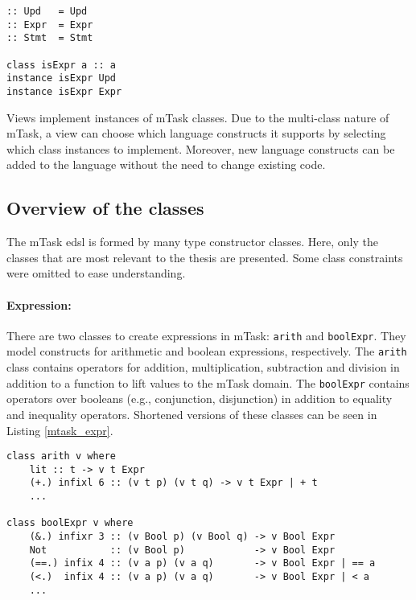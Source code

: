 \begin{lstlisting}[caption=mTask construction kinds, captionpos=b,label=mtask_kinds]
:: Upd   = Upd
:: Expr  = Expr
:: Stmt  = Stmt

class isExpr a :: a
instance isExpr Upd
instance isExpr Expr
\end{lstlisting}

Views implement instances of mTask classes. Due to the multi-class nature of mTask, a view can choose which language constructs it supports by selecting which class instances to implement. Moreover, new language constructs can be added to the language without the need to change existing code. 


\subsection{Overview of the classes}\label{mtask_classes}

The mTask \ac{edsl} is formed by many type constructor classes. Here, only the classes that are most relevant to the thesis are presented. Some class constraints were omitted to ease understanding.

\paragraph{Expression:} There are two classes to create expressions in mTask: \texttt{arith} and \texttt{boolExpr}. They model constructs for arithmetic and boolean expressions, respectively. The \texttt{arith} class contains operators for addition, multiplication, subtraction and division in addition to a function to lift values to the mTask domain. The \texttt{boolExpr} contains operators over booleans (e.g., conjunction, disjunction) in addition to equality and inequality operators. Shortened versions of these classes can be seen in Listing \ref{mtask_expr}. 

\begin{lstlisting}[caption=mTask expression classes,captionpos=b,label=mtask_expr]
class arith v where
	lit :: t -> v t Expr 
	(+.) infixl 6 :: (v t p) (v t q) -> v t Expr | + t
	...

class boolExpr v where
	(&.) infixr 3 :: (v Bool p) (v Bool q) -> v Bool Expr 
	Not           :: (v Bool p)            -> v Bool Expr 
	(==.) infix 4 :: (v a p) (v a q)       -> v Bool Expr | == a
	(<.)  infix 4 :: (v a p) (v a q)       -> v Bool Expr | < a
	...
\end{lstlisting}

